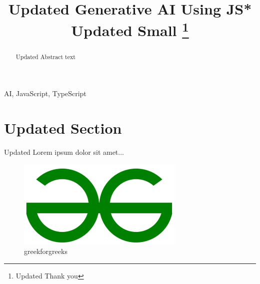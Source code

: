 \documentclass[conference]{IEEEtran}%
\begin{document}
%
\normalsize%
\title{Updated Generative AI Using JS*\\
    {\footnotesize Updated Small}
    \thanks{Updated Thank you}
    }%
\author{
}%
\maketitle%
\begin{abstract}%
Updated Abstract text%
\end{abstract}%
\begin{IEEEkeywords}%
AI, JavaScript, TypeScript%
\end{IEEEkeywords}%
\section{Updated Section}%
\label{sec:UpdatedSection}%
Updated Lorem ipsum dolor sit amet...
    \begin{figure}[htbp] 
    \centerline{\includegraphics[width=\linewidth]{image_1.png}}
    \caption{greekforgreeks}
    \label{fig:image_1.png}
    \end{figure}
\end{document}
